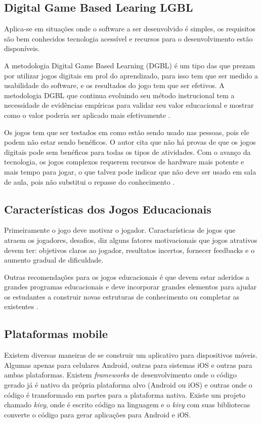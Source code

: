 \subsection[Digital Game Based Learing LGBL]{Digital Game Based Learing LGBL}
Aplica-se em situações onde o software a ser desenvolvido é simples, os requisitos são bem conhecidos tecnologia acessível e recursos para o desenvolvimento estão disponíveis.

A metodologia Digital Game Based Learning (DGBL) é um tipo das que prezam por utilizar jogos digitais em prol do aprendizado, para isso tem que ser medido a usabilidade do software, e os resultados do jogo tem que ser efetivos.
A metodologia DGBL que continua evoluindo seu método instrucional tem a necessidade de evidências empíricas para validar seu valor educacional e mostrar como o valor poderia ser aplicado mais efetivamente \cite{jogoSuporteMat}.


Os jogos tem que ser testados em como estão sendo usado nas pessoas, pois ele podem não estar sendo benéficos. 
O autor cita que não há provas de que os jogos digitais pode sem benéficos para todas os tipos de atividades.
Com o avanço da tecnologia, os jogos complexos requerem recursos de hardware mais potente e mais tempo para jogar, o que talvez pode indicar que não deve ser usado em sala de aula, pois não substitui o repasse do conhecimento \cite{jogoSuporteMat}.


\subsection[Características dos Jogos Educacionais]{Características dos Jogos Educacionais}
Primeiramente o jogo deve motivar o jogador. Caractarísticas de jogos que atraem os jogadores, desafios, 
\cite{jogoSuporteMat} diz alguns fatores motivacionais que jogos atrativos devem ter: objetivos claros ao jogador, resultatos incertos, fornecer feedbacks e o aumento gradual de dificuldade.

Outras recomendações para os jogos educacionais é que devem estar aderidos a grandes programas educacionais e deve incorporar grandes elementos para ajudar os estudantes a construir novas estruturas de conhecimento ou completar as existentes \cite{jogoSuporteMat}.

\subsection[Plataformas mobile]{Plataformas mobile}
Existem diversas maneiras de se construir um aplicativo para dispositivos móveis. Algumas apenas para celulares Android, outras para sistemas iOS e outras para ambas plataformas. Existem \textit{frameworks} de desenvolvimento onde o código gerado já é nativo da própria plataforma alvo (Android ou iOS) e outras onde o código é transformado em partes para a plataforma nativa.
Existe um  projeto chamado \textit{kivy}, onde é escrito código na linguagem  e o \textit{kivy} com suas bibliotecas converte o código para gerar aplicações para Android e iOS.

